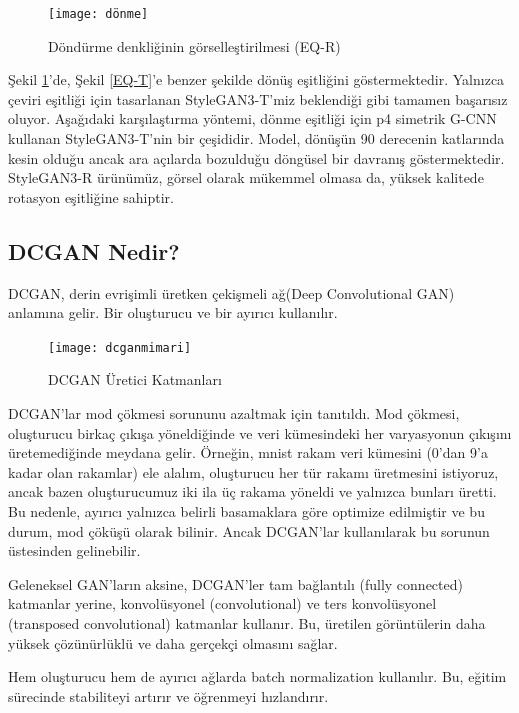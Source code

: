 \documentclass[12pt, a4paper]{article}
\begin{document}
	\clearpage
	\begin{figure}[h]
		\centering
		\texttt{[image: dönme]}
		\caption{Döndürme denkliğinin görselleştirilmesi (EQ-R)\cite{-2024-05-31}}
		\label{EQ-R}
	\end{figure}
	
	Şekil \ref{EQ-R}'de, Şekil \ref{EQ-T}'e benzer şekilde dönüş eşitliğini göstermektedir. Yalnızca çeviri eşitliği için tasarlanan StyleGAN3-T'miz beklendiği gibi tamamen başarısız oluyor. Aşağıdaki karşılaştırma yöntemi, dönme eşitliği için p4 simetrik G-CNN kullanan StyleGAN3-T'nin bir çeşididir. Model, dönüşün 90 derecenin katlarında kesin olduğu ancak ara açılarda bozulduğu döngüsel bir davranış göstermektedir. StyleGAN3-R ürünümüz, görsel olarak mükemmel olmasa da, yüksek kalitede rotasyon eşitliğine sahiptir.
	
	\subsection{DCGAN Nedir?}
	
	DCGAN, derin evrişimli üretken çekişmeli ağ(Deep Convolutional GAN) anlamına gelir. Bir oluşturucu ve bir ayırıcı kullanılır.
	
	\begin{figure}[h]
		\centering
		\texttt{[image: dcganmimari]}
		\label{dcganmimari}
		\caption{DCGAN Üretici Katmanları\cite{Train-2024-05-06}}
	\end{figure}
	\FloatBarrier
	DCGAN'lar mod çökmesi sorununu azaltmak için tanıtıldı. Mod çökmesi, oluşturucu birkaç çıkışa yöneldiğinde ve veri kümesindeki her varyasyonun çıkışını üretemediğinde meydana gelir. Örneğin, mnist rakam veri kümesini (0'dan 9'a kadar olan rakamlar) ele alalım, oluşturucu her tür rakamı üretmesini istiyoruz, ancak bazen oluşturucumuz iki ila üç rakama yöneldi ve yalnızca bunları üretti. Bu nedenle, ayırıcı yalnızca belirli basamaklara göre optimize edilmiştir ve bu durum, mod çöküşü olarak bilinir. Ancak DCGAN'lar kullanılarak bu sorunun üstesinden gelinebilir.
	
	Geleneksel GAN'ların aksine, DCGAN'ler tam bağlantılı (fully connected) katmanlar yerine, konvolüsyonel (convolutional) ve ters konvolüsyonel (transposed convolutional) katmanlar kullanır. Bu, üretilen görüntülerin daha yüksek çözünürlüklü ve daha gerçekçi olmasını sağlar.
	
	Hem oluşturucu hem de ayırıcı ağlarda batch normalization kullanılır. Bu, eğitim sürecinde stabiliteyi artırır ve öğrenmeyi hızlandırır.
	
\end{document}
